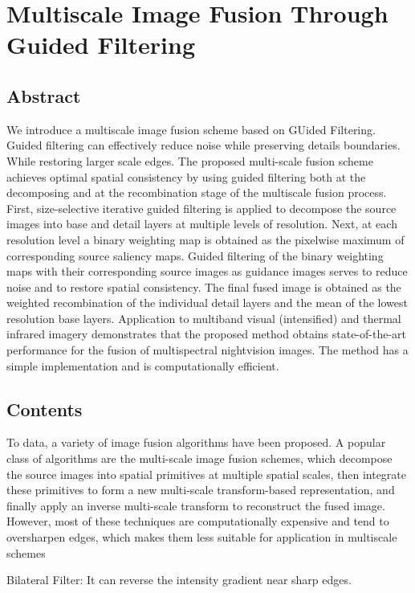 \section{Multiscale Image Fusion Through Guided Filtering}
\subsection{Abstract}
We introduce a multiscale image fusion scheme based on GUided Filtering. Guided filtering can effectively reduce noise while preserving details boundaries. While  restoring larger scale edges. The proposed multi-scale fusion scheme achieves optimal spatial consistency by using guided filtering both at the decomposing and at the recombination stage of the multiscale fusion process. First, size-selective iterative guided filtering is applied to decompose the source images into base and detail layers at multiple levels of resolution. Next, at each resolution level a binary weighting map is obtained as the pixelwise maximum of
corresponding source saliency maps. Guided filtering of the binary weighting maps with their corresponding source images as guidance images serves to reduce noise and to restore spatial consistency. The final fused image is obtained as the weighted recombination of the individual detail layers and the mean of the lowest resolution base layers. Application to multiband visual (intensified) and thermal infrared imagery demonstrates that the proposed method obtains state-of-the-art performance for the fusion of multispectral nightvision images. The method has a simple implementation and is computationally efficient\cite{toet2016multiscale}.

\subsection{Contents}
To data, a variety of image fusion algorithms have been proposed. A popular class of algorithms are the multi-scale image fusion schemes, which decompose the source images into spatial primitives at multiple spatial scales, then integrate these primitives to form a new multi-scale transform-based representation, and finally apply an inverse multi-scale transform to reconstruct the fused image. However, most of these techniques are computationally expensive and tend to oversharpen edges, which makes them less suitable for application in multiscale schemes

Bilateral Filter: It can reverse the intensity gradient near sharp edges.

